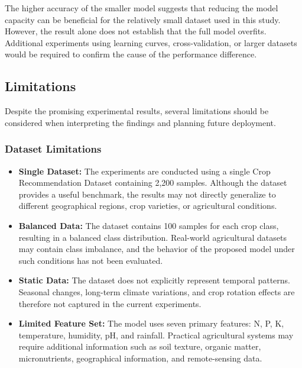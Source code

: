 \documentclass[journal]{IEEEtran}
\begin{document}
The higher accuracy of the smaller model suggests that reducing the model capacity can be beneficial for the relatively small dataset used in this study. However, the result alone does not establish that the full model overfits. Additional experiments using learning curves, cross-validation, or larger datasets would be required to confirm the cause of the performance difference.


\subsection{Limitations}

Despite the promising experimental results, several limitations should be considered when interpreting the findings and planning future deployment.


\subsubsection{Dataset Limitations}

\begin{itemize}[leftmargin=1.2em]
    \item \textbf{Single Dataset:} The experiments are conducted using a single Crop Recommendation Dataset containing 2,200 samples. Although the dataset provides a useful benchmark, the results may not directly generalize to different geographical regions, crop varieties, or agricultural conditions.

    \item \textbf{Balanced Data:} The dataset contains 100 samples for each crop class, resulting in a balanced class distribution. Real-world agricultural datasets may contain class imbalance, and the behavior of the proposed model under such conditions has not been evaluated.

    \item \textbf{Static Data:} The dataset does not explicitly represent temporal patterns. Seasonal changes, long-term climate variations, and crop rotation effects are therefore not captured in the current experiments.

    \item \textbf{Limited Feature Set:} The model uses seven primary features: N, P, K, temperature, humidity, pH, and rainfall. Practical agricultural systems may require additional information such as soil texture, organic matter, micronutrients, geographical information, and remote-sensing data.
\end{itemize}
\end{document}
